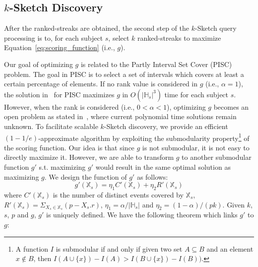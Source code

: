 \subsection{$k$-Sketch Discovery}
After the ranked-streaks are obtained,
the second step of the $k$-Sketch query processing is to, for each subject $s$, select
$k$ ranked-streaks to maximize Equation~\ref{eq:scoring_function} (i.e., $g$). 

Our goal of optimizing $g$ is related to the Partly Interval Set Cover (PISC) problem. The goal in PISC is to select a set
of intervals which covers at least a certain percentage of elements. If no rank value is considered in $g$ (i.e., $\alpha = 1$), the
solution in~\cite{golab2009sequential} for PISC maximizes $g$ in $O(|\mathbb{H}_s|^3)$ time for each subject $s$. However, when
the rank is considered (i.e., $0< \alpha < 1$), optimizing $g$ becomes an open problem as stated in~\cite{edwards2013partial}, where current polynomial time solutions remain unknown.
%
To facilitate scalable $k$-Sketch discovery, we provide 
an efficient $(1-1/e)$-approximate algorithm by exploiting the submodularity property\footnote{A function $I$ is submodular if and only if given two set $A \subseteq B$ and
an element $x \not\in B$, then $I(A \cup \{x\}) - I(A) > I(B \cup \{x\}) - I(B))$.} of the scoring function. Our idea is that since $g$ is not submodular, it is not easy to directly maximize it. 
However, we are able to transform $g$ to another submodular function $g'$ 
s.t. maximizing $g'$ would result in
the same optimal solution as maximizing $g$. We design the function of $g'$ as follows:
\begin{equation}
\label{eq:gscore}
g'(\mathbb{X}_s) = \eta_1C'(\mathbb{X}_s) + \eta_2R'(\mathbb{X}_s)
\end{equation}
where $C'(\mathbb{X}_s)$ is the number of distinct events covered by $\mathbb{X}_s$,
 $R'(\mathbb{X}_s) = \Sigma_{X_s \in \mathbb{X}_s}(p-X_s.r)$, $\eta_1 = \alpha/|\mathbb{H}_s|$
and $\eta_2 = (1-\alpha)/(pk)$. Given $k$, $s$, $p$ and $g$,
$g'$ is uniquely defined. We have the following theorem which links $g'$ to $g$:

